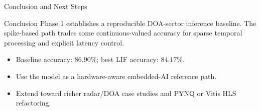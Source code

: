 \documentclass[aspectratio=169]{beamer}
\begin{document}
\begin{frame}{Conclusion and Next Steps}
\begin{block}{Conclusion}
Phase 1 establishes a reproducible DOA-sector inference baseline. The spike-based path trades some continuous-valued accuracy for sparse temporal processing and explicit latency control.
\end{block}
\begin{itemize}
    \item Baseline accuracy: $86.90\%$; best LIF accuracy: $84.17\%$.
    \item Use the model as a hardware-aware embedded-AI reference path.
    \item Extend toward richer radar/DOA case studies and PYNQ or Vitis HLS refactoring.
\end{itemize}
\end{frame}
\end{document}
